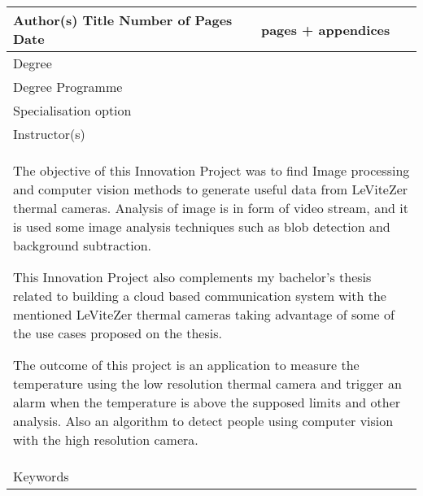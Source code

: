 \documentclass[hidelinks,11pt,a4paper,oneside,article]{memoir}
\begin{document}
	\begin{tabular}{ | p{} | p{} |}
		\hline
		Author(s) \newline
		Title \newline\newline 
		Number of Pages \newline
		Date
		& 
		\makeatletter
		\@author \newline
		\@title \newline\newline
		\pageref*{LastPage} pages + \total{chapter} appendices \newline %
		\IfLanguageName {finnish} {\foreignlanguage{english}{\longdate\@date}} {\@date}
		\makeatother
		\\ \hline
		Degree & \metropoliadegree
		\\ \hline
		Degree Programme & \metropoliadegreeprogramme
		\\ \hline
		Specialisation option & \metropoliaspecialisation
		\\ \hline
		Instructor(s) & \metropoliainstructors
		\\ \hline
		\multicolumn{2}{|p{15cm}|}{\begin{singlespacing}\vspace{-22pt}
				The objective of this Innovation Project was to find Image processing and computer vision methods to generate useful data from LeViteZer thermal cameras. Analysis of image is in form of video stream, and it is used some image analysis techniques such as blob detection and background subtraction.
				
				This Innovation Project also complements my bachelor's thesis related to building a cloud based communication system with the mentioned LeViteZer thermal cameras taking advantage of some of the use cases proposed on the thesis.
				
				The outcome of this project is an application to measure the temperature using the low resolution thermal camera and trigger an alarm when the temperature is above the supposed limits and other analysis. Also an algorithm to detect people using computer vision with the high resolution camera.
				
		\end{singlespacing}} \\[14cm] \hline
		Keywords & \metropoliakeywords
		\\ \hline
	\end{tabular}
	\clearpage
	
\end{document}
